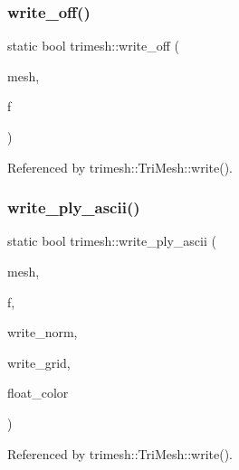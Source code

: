\subsubsection{\texorpdfstring{write\+\_\+off()}{write\_off()}}
{\footnotesize\ttfamily static bool trimesh\+::write\+\_\+off (\begin{DoxyParamCaption}\item[{\hyperlink{classtrimesh_1_1TriMesh}{Tri\+Mesh} $\ast$}]{mesh,  }\item[{F\+I\+LE $\ast$}]{f }\end{DoxyParamCaption})\hspace{0.3cm}{\ttfamily [static]}}



Referenced by trimesh\+::\+Tri\+Mesh\+::write().

\mbox{\label{namespacetrimesh_ab776a2c7edecbb77833442c20e69273e}} 
\subsubsection{\texorpdfstring{write\+\_\+ply\+\_\+ascii()}{write\_ply\_ascii()}}
{\footnotesize\ttfamily static bool trimesh\+::write\+\_\+ply\+\_\+ascii (\begin{DoxyParamCaption}\item[{\hyperlink{classtrimesh_1_1TriMesh}{Tri\+Mesh} $\ast$}]{mesh,  }\item[{F\+I\+LE $\ast$}]{f,  }\item[{bool}]{write\+\_\+norm,  }\item[{bool}]{write\+\_\+grid,  }\item[{bool}]{float\+\_\+color }\end{DoxyParamCaption})\hspace{0.3cm}{\ttfamily [static]}}



Referenced by trimesh\+::\+Tri\+Mesh\+::write().

\mbox{\label{namespacetrimesh_ae31b59d3573e30dd28c45a717fee89f9}} 
